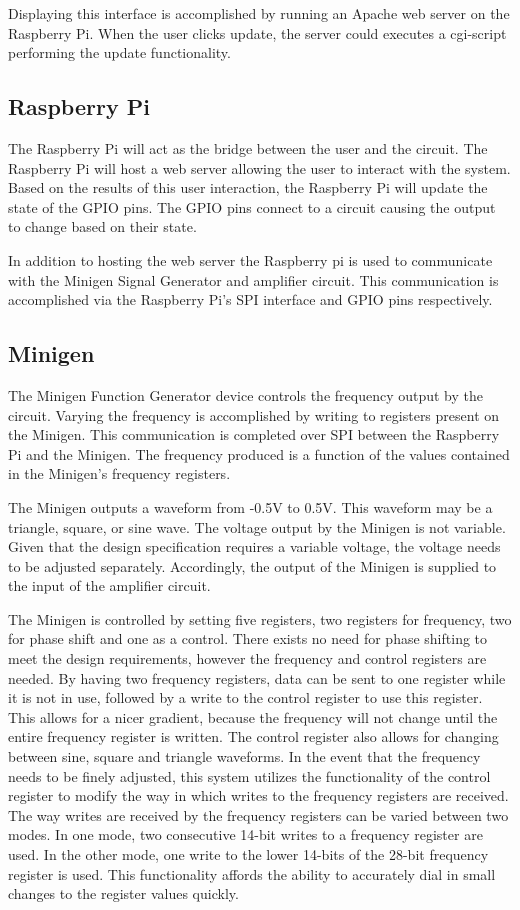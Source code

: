 \documentclass{article}	%
\begin{document}
\begin{multicols}{2}
Displaying this interface is accomplished by 
running an Apache web server on the Raspberry Pi. 
When the user clicks update, the server could executes 
a cgi-script performing the update functionality.

\subsection{Raspberry Pi}
The Raspberry Pi will act as the bridge between the user and the circuit.
The Raspberry Pi will host a web server allowing the user to interact with the system.
Based on the results of this user interaction, 
the Raspberry Pi will update the state of the GPIO pins.
The GPIO pins connect to a circuit causing the output to change based on their state. 

In addition to hosting the web server the Raspberry pi is used to
communicate with the 
Minigen Signal Generator and 
amplifier circuit.
This communication is accomplished via 
the Raspberry Pi's SPI interface and
GPIO pins respectively.

\subsection{Minigen}
The Minigen Function Generator device controls the frequency output by the circuit.
Varying the frequency is accomplished 
by writing to registers present on the Minigen.
This communication is completed over SPI between
the Raspberry Pi and the Minigen.
The frequency produced is a function of
the values contained in the Minigen's frequency registers.

The Minigen outputs a waveform 
from -0.5V to 0.5V. 
This waveform may be a triangle, square, or sine wave.
The voltage output by the Minigen is not variable.
Given that the design specification requires a variable voltage,
the voltage needs to be adjusted separately.
Accordingly, the output of the Minigen 
is supplied to the input of the amplifier circuit.

The Minigen is controlled by setting five registers,
two registers for frequency, 
two for phase shift and 
one as a control. 
There exists no need for phase shifting
to meet the design requirements, 
however the frequency and control registers
are needed. 
By having two frequency registers,
data can be sent to one register while it is not in use,
followed by a write to the control register to use this register.
This allows for a nicer gradient, 
because the frequency will not change until the entire frequency register is written. 
The control register also allows for changing between sine, square and triangle waveforms.
In the event that the frequency needs to be finely adjusted,
this system utilizes the functionality of the control register
to modify the way in which writes to the frequency registers are received.
The way writes are received by the frequency registers 
can be varied between two modes.
In one mode,
two consecutive 14-bit writes to a frequency register are used.
In the other mode,
one write to the lower 14-bits of the 28-bit frequency register is used.
This functionality affords the ability to accurately dial in small changes to the register values quickly.


\end{multicols}
\end{document}
